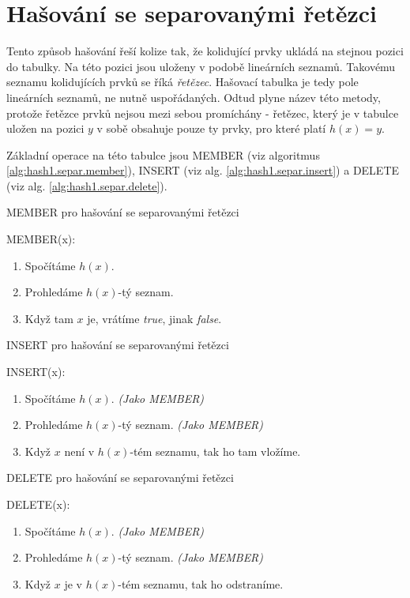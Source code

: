 \section{Hašování se separovanými řetězci}

Tento způsob hašování řeší kolize tak, že kolidující prvky ukládá na
stejnou pozici do tabulky. Na této pozici jsou uloženy v podobě 
lineárních seznamů. Takovému seznamu kolidujících prvků se říká
\emph{řetězec}.
Hašovací tabulka je tedy pole lineárních seznamů, ne nutně uspořádaných.
Odtud plyne název této metody, protože řetězce prvků nejsou mezi sebou
promíchány - řetězec, který je v tabulce uložen na pozici $y$ v sobě 
obsahuje pouze ty prvky, pro které platí $h(x) = y$.

Základní operace na této tabulce jsou MEMBER (viz algoritmus
\ref{alg:hash1.separ.member}),
INSERT (viz alg. \ref{alg:hash1.separ.insert}) a DELETE (viz alg. 
\ref{alg:hash1.separ.delete}).

\begin{algorithm}[!htb]
\caption{MEMBER pro hašování se separovanými řetězci}
\label{alg:hash1.separ.member}
MEMBER(x):
\begin{enumerate}
\item Spočítáme $h(x)$.
\item Prohledáme $h(x)$-tý seznam.
\item Když tam $x$ je, vrátíme {\em true}, jinak {\em false}.
\end{enumerate}
\end{algorithm}


\begin{algorithm}[!htb]
\caption{INSERT pro hašování se separovanými řetězci}
\label{alg:hash1.separ.insert}
INSERT(x):
\begin{enumerate}
\item Spočítáme $h(x)$. {\it (Jako MEMBER)}
\item Prohledáme $h(x)$-tý seznam. {\it (Jako MEMBER)}
\item Když $x$ není v $h(x)$-tém seznamu, tak ho tam vložíme.
\end{enumerate}
\end{algorithm}


\begin{algorithm}[!htb]
\caption{DELETE pro hašování se separovanými řetězci}
\label{alg:hash1.separ.delete}
DELETE(x):
\begin{enumerate}
\item Spočítáme $h(x)$. {\it (Jako MEMBER)}
\item Prohledáme $h(x)$-tý seznam. {\it (Jako MEMBER)}
\item Když $x$ je v $h(x)$-tém seznamu, tak ho odstraníme.
\end{enumerate}
\end{algorithm}



